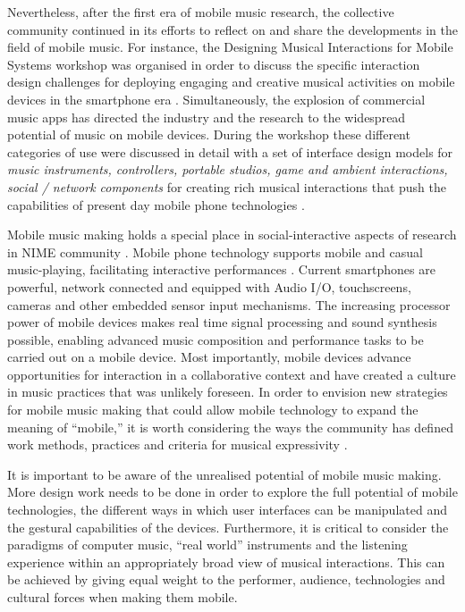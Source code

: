Nevertheless, after the first era of mobile music research, the collective community continued in its efforts to  reflect on and share the developments in the field of mobile music. For instance, the Designing Musical Interactions for Mobile Systems workshop was organised in order to discuss the specific interaction design challenges for deploying engaging and creative musical activities on mobile devices in the smartphone era \cite{Tahiroglu:2012}.  Simultaneously, the explosion of commercial music apps has directed the industry and the research to the widespread potential of music on mobile devices. During the workshop these different categories of use were discussed in detail with a set of  interface design models for  \textit{music instruments, controllers, portable studios, game and ambient interactions, social / network components}  for creating rich musical interactions that push the capabilities of present day mobile phone technologies \cite{Tahiroglu:2012}.

Mobile music making holds a special place in social-interactive aspects of research in NIME community \cite{Bryan-Kinns:2004,Yang:2015}. Mobile phone technology  supports  mobile and casual music-playing, facilitating interactive performances \cite{Wang:2009}.  Current smartphones are powerful, network connected and equipped with Audio I/O, touchscreens, cameras and other embedded sensor input mechanisms. The increasing processor power of mobile devices makes real time signal processing and sound synthesis possible, enabling advanced music composition and performance tasks to be carried out on a mobile device. 
Most importantly,  mobile devices advance opportunities for interaction in a collaborative context and have created a culture in music practices that was unlikely foreseen.
In order to envision new strategies for mobile music making that could allow mobile technology to expand the meaning of ``mobile,'' it is worth considering the ways the community has defined work methods, practices  and criteria for musical expressivity \cite{Tanaka:2012}.

It is important to be aware of the unrealised potential of mobile music making. More design work needs to be done in order to explore the full potential of mobile technologies, the different ways in which user interfaces can be manipulated and the gestural capabilities of the devices. 
Furthermore, it is critical to consider the paradigms of computer music, ``real world'' instruments and the listening experience within an appropriately broad view of musical interactions. This can be achieved by giving equal weight to the performer, audience, technologies and cultural forces when making them mobile.
